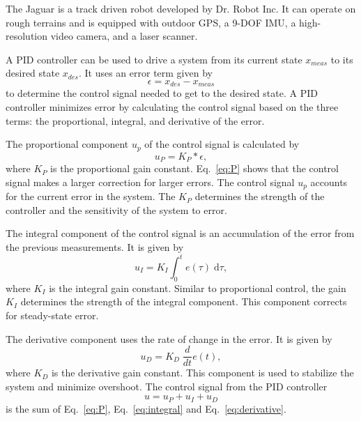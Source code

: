 \documentclass[conference]{../IEEEtran}
\begin{document}
The Jaguar is a track driven robot developed by Dr. Robot Inc. It can operate on rough
terrains and is equipped with outdoor GPS, a 9-DOF IMU, a high-resolution video camera,
and a laser scanner.

A PID controller can be used to drive a system from its current state $x_{meas}$ to its
desired state $x_{des}$. It uses an error term given by
\begin{equation}
  \epsilon=x_{des}-x_{meas}
\label{eq:error}
\end{equation}
to determine the control signal needed to get to the desired state.  A PID controller
minimizes error by calculating the control signal based on the three terms: the
proportional, integral, and derivative of the error.

The proportional component $u_p$ of the control signal is calculated by
\begin{equation}
u_P = K_P *\epsilon,
\label{eq:P}
\end{equation}
where $K_P$ is the proportional gain constant.  Eq.~\ref{eq:P} shows that the control
signal makes a larger correction for larger errors. The control signal $u_p$ accounts for
the current error in the system.  The $K_P$ determines the strength of the controller and
the sensitivity of the system to error.

The integral component of the control signal is an accumulation of the error from the
previous measurements. It is given by
\begin{equation}
u_I = K_I\int_{0}^{t} e(\tau)\; \text{d}\tau,
\label{eq:integral}
\end{equation}
where $K_I$ is the integral gain constant.  Similar to proportional control, the gain
$K_I$ determines the strength of the integral component. This component corrects for
steady-state error.

The derivative component uses the rate of change in the error. It is given by 
\begin{equation}
u_D = K_D \; \frac{d}{dt}e(t),
\label{eq:derivative}
\end{equation}
where $K_D$ is the derivative gain constant.  This component is used to stabilize the
system and minimize overshoot.  The control signal from the PID controller
\begin{equation}
u=u_P + u_I + u_D
\end{equation}
is the sum of Eq.~\ref{eq:P}, Eq.~\ref{eq:integral} and Eq.~\ref{eq:derivative}.


\end{document}
